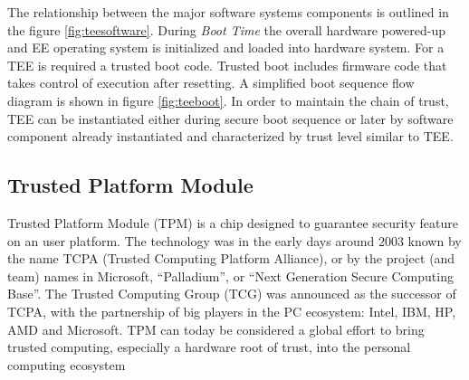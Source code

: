 \documentclass[../tesi.tex]{subfiles}
\begin{document}
The relationship between the major software systems components is outlined in the figure \ref{fig:teesoftware}. 
During \emph{Boot Time} the overall hardware powered-up and EE operating system is initialized and loaded into hardware system. For a TEE is required a trusted boot code. Trusted boot includes firmware code that takes control of execution after resetting. A simplified boot sequence flow diagram is shown in figure \ref{fig:teeboot}. 
In order to maintain the chain of trust, TEE can be instantiated either during secure boot sequence or later by software component already instantiated and characterized by  trust level similar to TEE. 

\subsection{Trusted Platform Module}
Trusted Platform Module (TPM) is a chip designed to guarantee security feature on an user platform. The technology was in the early days around 2003 known by the name TCPA (Trusted Computing Platform Alliance), or by the project (and team) names in Microsoft, “Palladium”, or “Next Generation Secure Computing Base”.  The Trusted Computing Group (TCG) was announced as the successor of TCPA, with the partnership of big players in the PC ecosystem: Intel, IBM, HP, AMD and Microsoft. TPM can today be considered a global effort to bring trusted computing, especially a hardware root of trust,
into the personal computing ecosystem
\end{document}
